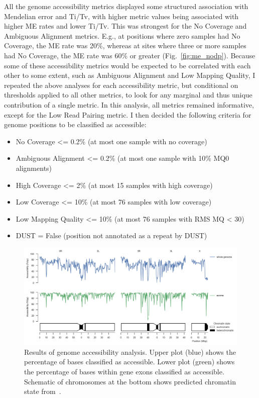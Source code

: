 \documentclass[a4paper,11pt,abstracton,hidelinks]{scrartcl}
\begin{document}
All the genome accessibility metrics displayed some structured association with Mendelian error and Ti/Tv, with higher metric values being associated with higher ME rates and lower Ti/Tv.
%
This was strongest for the No Coverage and Ambiguous Alignment metrics.
%
E.g., at positions where zero samples had No Coverage, the ME rate was 20\%, whereas at sites where three or more samples had No Coverage, the ME rate was 60\% or greater (Fig.~\ref{fig:me_nodp}).
%
Because some of these accessibility metrics would be expected to be correlated with each other to some extent, such as Ambiguous Alignment and Low Mapping Quality, I repeated the above analyses for each accessibility metric, but conditional on thresholds applied to all other metrics, to look for any marginal and thus unique contribution of a single metric.
%
In this analysis, all metrics remained informative, except for the Low Read Pairing metric.
%
I then decided the following criteria for genome positions to be classified as accessible:
%
\begin{itemize}
\item No Coverage <= 0.2\% (at most one sample with no coverage)
\item Ambiguous Alignment <= 0.2\% (at most one sample with 10\% MQ0 alignments)
\item High Coverage <= 2\% (at most 15 samples with high coverage)
\item Low Coverage <= 10\% (at most 76 samples with low coverage)
\item Low Mapping Quality <= 10\% (at most 76 samples with RMS MQ < 30)
\item DUST = False (position not annotated as a repeat by DUST)
\end{itemize}


\begin{figure}[t!]
\centering
\includegraphics[width=\textwidth]{artwork/chapter3/accessibility.jpeg}
\caption{Results of genome accessibility analysis.
%
Upper plot (blue) shows the percentage of bases classified as accessible.
%
Lower plot (green) shows the percentage of bases within gene exons classified as accessible.
%
Schematic of chromosomes at the bottom shows predicted chromatin state from~\parencite{Sharakhova2010}.
%
}
%
\label{fig:accessibility}
\end{figure}
\end{document}
